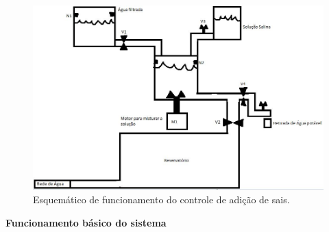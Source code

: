   \begin{figure}[!htbp]
    \centering
    \includegraphics[scale=0.6]{editaveis/figuras/funcionamento_adicao_sais}
    \caption[Esquemático de funcionamento do controle de adição de sais]{Esquemático de funcionamento do controle de adição de sais.}
    \label{funcionamento_adicao_sais}
  \end{figure}
  \FloatBarrier
    
\begin{center}
\textbf{Funcionamento básico do sistema}
\end{center}


